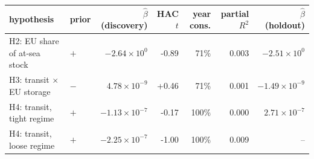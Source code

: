 \begin{tabular}{llrrrrr}
\toprule
hypothesis & prior & $\hat\beta$ (discovery) & HAC $t$ & year cons. & partial $R^2$ & $\hat\beta$ (holdout) \\
\midrule
  H2: EU share of at-sea stock & $+$ & $-2.64 \times 10^{0}$ & -0.89 & 71\% & 0.003 & $-2.51 \times 10^{0}$ \\
  H3: transit $\times$ EU storage & $-$ & $4.78 \times 10^{-9}$ & +0.46 & 71\% & 0.001 & $-1.49 \times 10^{-9}$ \\
  H4: transit, tight regime & $+$ & $-1.13 \times 10^{-7}$ & -0.17 & 100\% & 0.000 & $2.71 \times 10^{-7}$ \\
  H4: transit, loose regime & $+$ & $-2.25 \times 10^{-7}$ & -1.00 & 100\% & 0.009 & -- \\
\bottomrule
\end{tabular}
